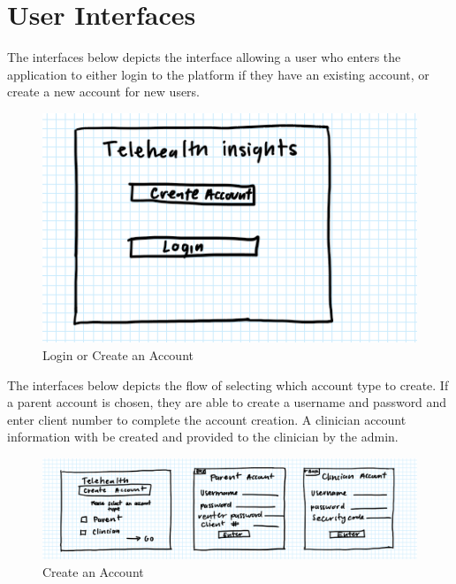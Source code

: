 \documentclass[12pt, titlepage]{article}
\begin{document}
\section{User Interfaces}


\hspace{1.5em}The interfaces below depicts the interface allowing a user who enters the application to either login to the platform if they have an existing account, or create a new account for new users.
\begin{figure}[H]
  \centering
  \includegraphics[scale=0.9]{images/createORlogin.png}
  \caption{Login or Create an Account}
\end{figure}

\hspace{1.5em}The interfaces below depicts the flow of selecting which account type to create. If a parent account is chosen, they are able to create a username and password and enter client number to complete the account creation. A clinician account information with be created and provided to the clinician by the admin.
\begin{figure}[H]
  \centering
  \includegraphics[scale=0.9]{images/create account.png}
  \caption{Create an Account}
\end{figure}
\end{document}
